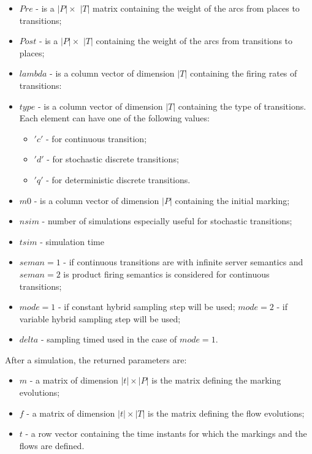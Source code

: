 \begin{itemize}
\item $Pre$ - is a $|P| \times$ $|T|$ matrix containing the weight of the arcs from places to transitions;
\item $Post$ - is a $|P| \times$ $|T|$   containing the weight of the arcs from transitions to places;
\item $lambda$ - is a column vector of dimension $|T|$ containing the firing rates of transitions:
\item $type$ - is a column vector of dimension $|T|$ containing the type of transitions. Each element can have one of the following values:
\begin{itemize}
\item $'c'$ - for continuous transition;
\item $'d'$ - for stochastic discrete transitions;
\item $'q'$ -  for deterministic  discrete transitions.
\end{itemize}
\item $m0$ - is a column vector of dimension $|P|$ containing the initial marking;
\item $nsim$ - number of simulations especially useful for stochastic transitions;
\item $tsim$ - simulation time
\item $seman = 1$ - if continuous transitions are with infinite server semantics and $seman = 2$ is product firing semantics is considered for continuous transitions;
\item $mode = 1$ - if constant hybrid sampling step will be used;  $mode = 2$ - if variable hybrid sampling step will be used;  
\item $delta$ - sampling timed used in the case of $mode = 1$.
\end{itemize}
 
 After a simulation, the returned parameters are:

\begin{itemize} 
\item $m$ - a matrix of dimension $|t| \times |P|$ is the matrix defining the marking evolutions;
\item $f$ - a matrix of dimension $|t| \times |T|$ is the matrix defining the flow evolutions;
\item $t$ - a row vector containing the time instants for which the markings and the flows are defined.
\end{itemize}

\newpage
